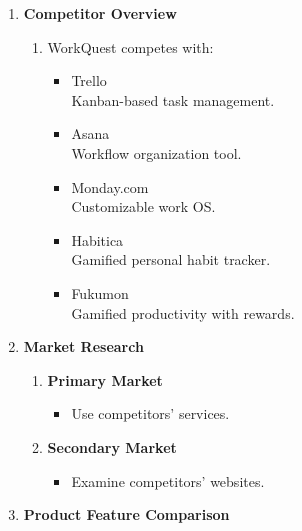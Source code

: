 \begin{enumerate}

    \item \textbf{Competitor Overview}
    \begin{enumerate}
        \item WorkQuest competes with:
        \begin{itemize}
            \item Trello \\ Kanban-based task management.
            \item Asana \\ Workflow organization tool.
            \item Monday.com \\ Customizable work OS.
            \item Habitica \\ Gamified personal habit tracker.
            \item Fukumon \\ Gamified productivity with rewards.
        \end{itemize}
    \end{enumerate}
    
    \item \textbf{Market Research}
    \begin{enumerate}
        \item \textbf{Primary Market}
        \begin{itemize}
            \item Use competitors’ services.
        \end{itemize}
        
        \item \textbf{Secondary Market}
        \begin{itemize}
            \item Examine competitors’ websites.
        \end{itemize}
    \end{enumerate}

    \item \textbf{Product Feature Comparison}


\end{enumerate}
